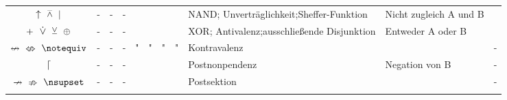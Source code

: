 \documentclass[english,ngerman,parskip=half,headsepline,footsepline]{scrreprt}
\newcommand*{\clq}{'}%
\newcommand*{\crq}{'}%
\newcommand*{\cse}{, }%
\newcommand*{\csp}{\crqt\cset\clqt}%
\newcommand*{\clqt}{}%
\newcommand*{\crqt}{}%
\newcommand*{\cset}{~}%
\newcommand*{\cspt}{\crqt\cset\clqt}%
\begin{document}
\begin{table}
\begin{threeparttable}
\begin{tabularx}{\linewidth-10.95pt}{c||c:cc:cccc|X:X|c|}
				\clqt$\uparrow$\cspt$\barwedge$\cspt$\mid$\crqt &-&-&-&\textfalse&\texttrue&\texttrue&\texttrue& NAND; Unverträglichkeit;\newline Sheffer-Funktion&Nicht zugleich A und B&\thepnand\\
				\tableline%
				\clqt$+$\cspt$\operatorname{\dot\lor}$\cspt$\veebar$\cspt$\oplus$\crqt &-&-&-&\textfalse&\texttrue&\texttrue&\textfalse& XOR; Antivalenz;\newline ausschließende Disjunktion&Entweder A oder B&\thepxor\\
				\gapline%
				\clqt$\nleftrightarrow$\cspt$\nLeftrightarrow$\cspt$\lnequivB$\crqt &-&-&-&"&"&"&"& Kontravalenz&&-\\
				\tableline%
				$\lceil$ &-&-&-&\textfalse&\texttrue&\textfalse&\texttrue& Postnonpendenz&Negation von B&-\\
				\tableline%
				\clqt$\nrightarrow$\cspt$\nRightarrow$\cspt$\lnrightimpB$\crqt &-&-&-&\textfalse&\texttrue&\textfalse&\textfalse& Postsektion&&-\\
				\tablegroup%


\end{tabularx}
\end{threeparttable}
\end{table}
\end{document}
